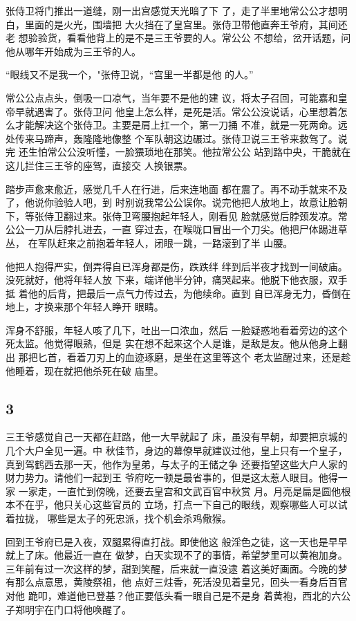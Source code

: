 张侍卫将门推出一道缝，刚一出宫感觉天光暗了下
了，走了半里地常公公才想明白，里面的是火光，围墙把
大火挡在了皇宫里。张侍卫带他直奔王爷府，其间还老
想验验货，看看他背上的是不是三王爷要的人。常公公
不想给，岔开话题，问他从哪年开始成为三王爷的人。

“眼线又不是我一个，"张侍卫说，“宫里一半都是他
的人。”

常公公点点头，倒吸一口凉气，当年要不是他的建
议，将太子召回，可能嘉和皇帝早就遇害了。张侍卫问
他皇上怎么样，是死是活。常公公没说话，心里想着怎
么才能解决这个张侍卫。主要是肩上扛一个，第一刀捅
不准，就是一死两命。远处传来马蹄声，轰隆隆地像整
个军队朝这边碾过。张侍卫说三王爷来救驾了。说完
还生怕常公公没听懂，一脸猥琐地在那笑。他拉常公公
站到路中央，干脆就在这儿拦住三王爷的座驾，直接交
人换银票。

踏步声愈来愈近，感觉几千人在行进，后来连地面
都在震了。再不动手就来不及了，他说你验验人吧，到
时别说我常公公误你。说完他把人放地上，故意让脸朝
下，等张侍卫翻过来。张侍卫弯腰抱起年轻人，刚看见
脸就感觉后脖颈发凉。常公公一刀从后脖扎进去，一直
穿过去，在喉咙口冒出一个刀尖。他把尸体踢进草丛，
在军队赶来之前抱着年轻人，闭眼一跳，一路滚到了半
山腰。

他把人抱得严实，倒弄得自已浑身都是伤，跌跌绊
绊到后半夜才找到一间破庙。没死就好，他将年轻人放
下来，端详他半分钟，痛哭起来。他脱下他衣服，双手抵
着他的后背，把最后一点气力传过去，为他续命。直到
自已浑身无力，昏倒在地上，才换来那个年轻人睁开
眼睛。

浑身不舒服，年轻人咳了几下，吐出一口浓血，然后
一脸疑惑地看着旁边的这个死太监。他觉得眼熟，但是
实在想不起来这个人是谁，是敌是友。他从他身上翻出
那把匕首，看着刀刃上的血迹琢磨，是坐在这里等这个
老太监醒过来，还是趁他睡着，现在就把他杀死在破
庙里。
\newline

{\centering\subsection{3}}

三王爷感觉自己一天都在赶路，他一大早就起了
床，虽没有早朝，却要把京城的几个大户全见一遍。中
秋佳节，身边的幕僚早就建议过他，皇上只有一个皇子，
真到驾鹤西去那一天，他作为皇弟，与太子的王储之争
还要指望这些大户人家的财力势力。请他们一起到王
爷府吃一顿是最省事的，但是这太惹人眼目。他得一家
一家走，一直忙到傍晚，还要去皇宫和文武百官中秋赏
月。月亮是扁是圆他根本不在乎，他只关心这些官员的
立场，打点一下自己的眼线，观察哪些人可以试着拉拢，
哪些是太子的死忠派，找个机会杀鸡儆猴。

回到王爷府已是入夜，双腿累得直打战。即使他这
般淫色之徒，这一天也是早早就上了床。他最近一直在
做梦，白天实现不了的事情，希望梦里可以黄袍加身。
三年前有过一次这样的梦，甜到笑醒，后来就一直没逮
着这美好画面。今晚的梦有那么点意思，黄陵祭祖，他
点好三炷香，死活没见着皇兄，回头一看身后百官对他
跪叩，难道他已登基？他正要低头看一眼自己是不是身
着黄袍，西北的六公子郑明宇在门口将他唤醒了。

